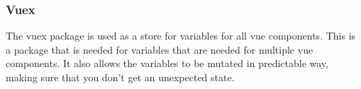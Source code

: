 \subsubsection{Vuex}
The vuex\cite{VUEX} package is used as a store for variables for all vue components. This is a package that is needed for variables that are needed for multiple vue components. It also allows the variables to be mutated in predictable way, making sure that you don't get an unexpected state.